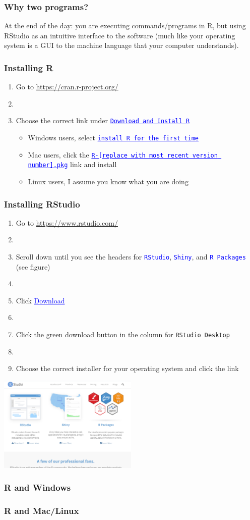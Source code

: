 \documentclass[12pt]{beamer}
\newcommand{\myframe}[1]{\begin{frame} \frametitle{#1}}
\newenvironment{spaceitemize}
{ \begin{itemize}
    \setlength{\itemsep}{10pt}
    \setlength{\parskip}{0pt}
    \setlength{\parsep}{0pt}     }
{ \end{itemize}                  }
\begin{document}
\myframe{Why two programs?}
At the end of the day: you are executing commands/programs in R, but using RStudio as an intuitive interface to the software (much like your operating system is a GUI to the machine language that your computer understands).
\end{frame}

\myframe{Installing R}
\begin{enumerate}
\item Go to \url{https://cran.r-project.org/}
\item[]
\item Choose the correct link under \textcolor{blue}{\underline{\texttt{Download and Install R}}}
\begin{spaceitemize}
\item Windows users, select \textcolor{blue}{\underline{\texttt{install R for the first time}}}
\item Mac users, click the \textcolor{blue}{\underline{\texttt{R-[replace with most recent version number].pkg}}} link and install
\item Linux users, I assume you know what you are doing
\end{spaceitemize}
\end{enumerate}

\end{frame}

\myframe{Installing RStudio}
\begin{enumerate}
\item Go to \url{https://www.rstudio.com/}
\item[]
\item Scroll down until you see the headers for \textcolor{blue}{\texttt{RStudio}}, \textcolor{blue}{\texttt{Shiny}}, and \textcolor{blue}{\texttt{R Packages}}  (see figure)
\item[]
\item Click \textcolor{blue}{\underline{Download}}
\item[] 
\item Click the green download button in the column for \texttt{RStudio Desktop}
\item[]
\item Choose the correct installer for your operating system and click the link
\end{enumerate}
\centering
\includegraphics[width = 0.5\textwidth]{../rstudio_download.png}
\end{frame}

\myframe{R and Windows}

\end{frame}

\myframe{R and Mac/Linux}

\end{frame}
\end{document}
